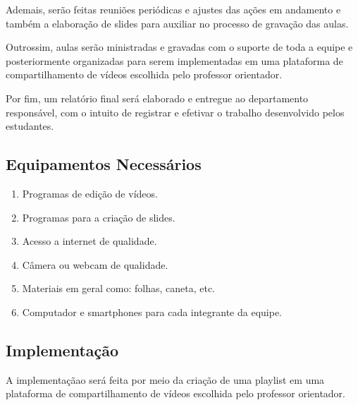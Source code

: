 \documentclass[a4paper,10pt]{article} %
\begin{document}
Ademais, serão feitas reuniões periódicas e ajustes das ações em andamento e também a elaboração de slides para auxiliar no processo de gravação das aulas.

Outrossim, aulas serão ministradas e gravadas com o suporte de toda a equipe e posteriormente organizadas para serem implementadas em uma plataforma de compartilhamento de vídeos escolhida  pelo  professor orientador.

Por fim, um relatório final será elaborado e entregue ao departamento responsável, com o intuito de registrar e efetivar o trabalho desenvolvido pelos estudantes.
 
\subsection{Equipamentos Necessários}

\begin{enumerate}
 \item Programas de edição de vídeos. 
 \item Programas para a criação de slides.
 \item Acesso a internet de qualidade.
 \item Câmera ou webcam de qualidade.
 \item Materiais em geral como: folhas, caneta, etc.
 \item Computador e smartphones para cada integrante da equipe.
\end{enumerate}

\subsection{Implementação}
A implementaçãao será feita por meio da criação de uma playlist em uma plataforma de compartilhamento de vídeos escolhida pelo professor orientador.

\end{document}
